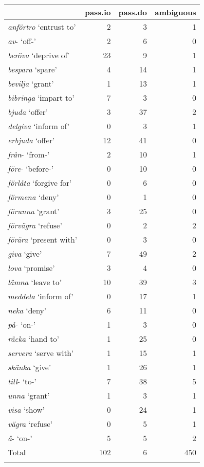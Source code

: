 \documentclass[output=paper]{langscibook}
\begin{document}
\label{falk:appendix:3}
\begin{table}[H]
\begin{tabular}{l rrr}
\lsptoprule
& pass.io & pass.do & ambiguous\\\midrule
\textit{anförtro} ‘entrust to’ &  2 & 3  & 1\\
\textit{av}{}- ‘off-’          &  2 & 6  & 0\\
\textit{beröva} ‘deprive of’   & 23 & 9  & 1\\
\textit{bespara} ‘spare’       &  4 & 14 & 1\\
\textit{bevilja} ‘grant’       &  1 & 13 & 1\\
\textit{bibringa} ‘impart to’  &  7 & 3  & 0\\
\textit{bjuda} ‘offer’         &  3 & 37 & 2\\
\textit{delgiva} ‘inform of’   &  0 &  3 & 1\\
\textit{erbjuda} ‘offer’       & 12 & 41 & 0\\
\textit{från}{}- ‘from-’       &  2 & 10 & 1\\
\textit{före}{}- ‘before-’     &  0 & 10 & 0\\
\textit{förlåta} ‘forgive for’ &  0 &  6 & 0\\
\textit{förmena} ‘deny’        &  0 &  1 & 0\\
\textit{förunna} ‘grant’       &  3 & 25 & 0\\
\textit{förvägra} ‘refuse’     &  0 &  2 & 2\\
\textit{förära} ‘present with’ &  0 &  3 & 0\\
\textit{giva} ‘give’           &  7 & 49 & 2\\
\textit{lova} ‘promise’        &  3 &  4 & 0\\
\textit{lämna} ‘leave to’      & 10 & 39 & 3\\
\textit{meddela} ‘inform of’   &  0 & 17 & 1\\
\textit{neka} ‘deny’           &  6 & 11 & 0\\
\textit{på}{}- ‘on-’           &  1 &  3 & 0\\
\textit{räcka} ‘hand to’       &  1 & 25 & 0\\
\textit{servera} ‘serve with’  &  1 & 15 & 1\\
\textit{skänka} ‘give’         &  1 & 26 & 1\\
\textit{till}{}- ‘to-’         &  7 & 38 & 5\\
\textit{unna} ‘grant’          &  1 &  3 & 1\\
\textit{visa} ‘show’           &  0 & 24 & 1\\
\textit{vägra} ‘refuse’        &  0 &  5 & 1\\
\textit{å}{}- ‘on-’            &  5 &  5 & 2\\
Total & 102 & 6 & 450\\\lspbottomrule
\end{tabular}
\end{table}

{\sloppy\printbibliography[heading=subbibliography,notkeyword=this]}
\end{document}
